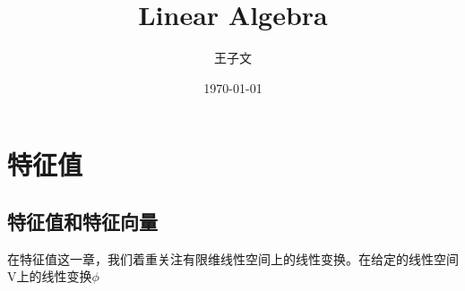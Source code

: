 \documentclass[lang=cn,newtx,10pt,scheme=chinese]{elegantbook}
\title{Linear Algebra}
\author{王子文}
\date{\today}
\begin{document}
	
\maketitle
\frontmatter

\tableofcontents

\mainmatter

\chapter{特征值}

\section{特征值和特征向量}
在特征值这一章，我们着重关注有限维线性空间上的线性变换。在给定的线性空间V上的线性变换$\phi$
\end{document}
